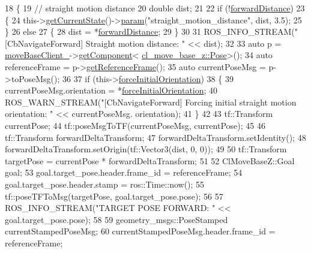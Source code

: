 \begin{DoxyCode}
18 \{
19   \textcolor{comment}{// straight motion distance}
20   \textcolor{keywordtype}{double} dist;
21 
22   \textcolor{keywordflow}{if} (!\hyperlink{classcl__move__base__z_1_1CbNavigateForward_a41bc9c319c64be6302f7365173ccd2c5}{forwardDistance})
23   \{
24     this->\hyperlink{classsmacc_1_1ISmaccClientBehavior_a34fde34e48fa13db622ee60d8374d0b8}{getCurrentState}()->\hyperlink{classsmacc_1_1ISmaccState_a4f2ff8e3eda8aa9bbb60c8ff17d0def1}{param}(\textcolor{stringliteral}{"straight\_motion\_distance"}, dist, 3.5);
25   \}
26   \textcolor{keywordflow}{else}
27   \{
28     dist = *\hyperlink{classcl__move__base__z_1_1CbNavigateForward_a41bc9c319c64be6302f7365173ccd2c5}{forwardDistance};
29   \}
30 
31   ROS\_INFO\_STREAM(\textcolor{stringliteral}{"[CbNavigateForward] Straight motion distance: "} << dist);
32 
33   \textcolor{keyword}{auto} p = \hyperlink{classcl__move__base__z_1_1CbMoveBaseClientBehaviorBase_ab2ef219464cfac8659b4a87c8d0db6d5}{moveBaseClient\_}->\hyperlink{classsmacc_1_1ISmaccClient_adef78db601749ca63c19e74a27cb88cc}{getComponent}<
      \hyperlink{classcl__move__base__z_1_1Pose}{cl\_move\_base\_z::Pose}>();
34   \textcolor{keyword}{auto} referenceFrame = p->\hyperlink{classcl__move__base__z_1_1Pose_af8c2dc151e74aa8da6b283d1c8563051}{getReferenceFrame}();
35   \textcolor{keyword}{auto} currentPoseMsg = p->toPoseMsg();
36 
37   \textcolor{keywordflow}{if} (this->\hyperlink{classcl__move__base__z_1_1CbNavigateForward_ac73da1af2bca33f0927310f75d8d2e35}{forceInitialOrientation})
38   \{
39     currentPoseMsg.orientation = *\hyperlink{classcl__move__base__z_1_1CbNavigateForward_ac73da1af2bca33f0927310f75d8d2e35}{forceInitialOrientation};
40     ROS\_WARN\_STREAM(\textcolor{stringliteral}{"[CbNavigateForward] Forcing initial straight motion orientation: "} << currentPoseMsg.
      orientation);
41   \}
42 
43   tf::Transform currentPose;
44   tf::poseMsgToTF(currentPoseMsg, currentPose);
45 
46   tf::Transform forwardDeltaTransform;
47   forwardDeltaTransform.setIdentity();
48   forwardDeltaTransform.setOrigin(tf::Vector3(dist, 0, 0));
49 
50   tf::Transform targetPose = currentPose * forwardDeltaTransform;
51 
52   ClMoveBaseZ::Goal goal;
53   goal.target\_pose.header.frame\_id = referenceFrame;
54   goal.target\_pose.header.stamp = ros::Time::now();
55   tf::poseTFToMsg(targetPose, goal.target\_pose.pose);
56 
57   ROS\_INFO\_STREAM(\textcolor{stringliteral}{"TARGET POSE FORWARD: "} << goal.target\_pose.pose);
58 
59   geometry\_msgs::PoseStamped currentStampedPoseMsg;
60   currentStampedPoseMsg.header.frame\_id = referenceFrame;

\end{DoxyCode}
